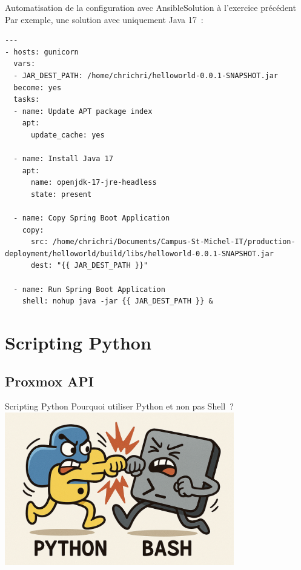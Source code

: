 \documentclass{beamer}
\begin{document}
    \begin{frame}[fragile]{Automatisation de la configuration avec Ansible}{Solution à l'exercice précédent}
        Par exemple, une solution avec uniquement Java 17~:
        \begin{lstlisting}[basicstyle=\ttfamily\tiny]
---
- hosts: gunicorn
  vars:
  - JAR_DEST_PATH: /home/chrichri/helloworld-0.0.1-SNAPSHOT.jar
  become: yes
  tasks:
  - name: Update APT package index
    apt:
      update_cache: yes

  - name: Install Java 17
    apt:
      name: openjdk-17-jre-headless
      state: present

  - name: Copy Spring Boot Application
    copy:
      src: /home/chrichri/Documents/Campus-St-Michel-IT/production-deployment/helloworld/build/libs/helloworld-0.0.1-SNAPSHOT.jar
      dest: "{{ JAR_DEST_PATH }}"

  - name: Run Spring Boot Application
    shell: nohup java -jar {{ JAR_DEST_PATH }} &
        \end{lstlisting}
    \end{frame}


    \section{Scripting Python}\label{sec:scriptingpython}

    \subsection{Proxmox API}\label{subsec:proxmoxapi}

    \begin{frame}{Scripting Python}
        Pourquoi utiliser Python et non pas Shell~?
        \bigbreak
        \centering
        \includegraphics[width=10cm]{image/python-vs-bash}
    \end{frame}
\end{document}
